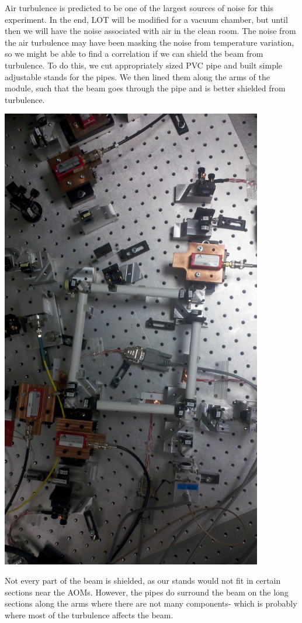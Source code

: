 \documentclass[11 pt]{article}
\begin{document}
\indent\indent Air turbulence is predicted to be one of the largest sources of noise for this experiment. In the end, LOT will be modified for a vacuum chamber, but until then we will have the noise associated with air in the clean room. The noise from the air turbulence may have been masking the noise from temperature variation, so we might be able to find a correlation if we can shield the beam from turbulence. To do this, we cut appropriately sized PVC pipe and built simple adjustable stands for the pipes. We then lined them along the arms of the module, such that the beam goes through the pipe and is better shielded from turbulence.\\\begin{center}\includegraphics[width=4.5in]{piping.jpg}\\\end{center} Not every part of the beam is shielded, as our stands would not fit in certain sections near the AOMs. However, the pipes do surround the beam on the long sections along the arms where there are not many components- which is probably where most of the turbulence affects the beam.
\end{document}
